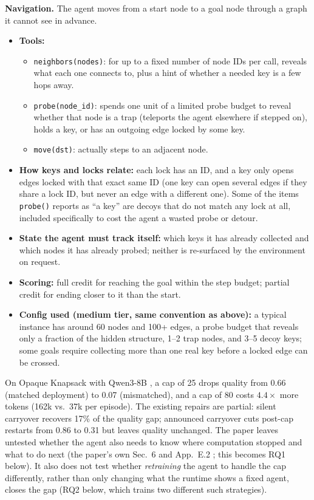 \documentclass[11pt,a4paper]{article}
\begin{document}
\textbf{Navigation.} The agent moves from a start node to a goal node through a graph it cannot
see in advance.
\begin{itemize}
\item \textbf{Tools:}
  \begin{itemize}
  \item \texttt{neighbors(nodes)}: for up to a fixed number of node IDs per call, reveals what
    each one connects to, plus a hint of whether a needed key is a few hops away.
  \item \texttt{probe(node\_id)}: spends one unit of a limited probe budget to reveal whether
    that node is a trap (teleports the agent elsewhere if stepped on), holds a key, or has an
    outgoing edge locked by some key.
  \item \texttt{move(dst)}: actually steps to an adjacent node.
  \end{itemize}
\item \textbf{How keys and locks relate:} each lock has an ID, and a key only opens edges locked
  with that exact same ID (one key can open several edges if they share a lock ID, but never an
  edge with a different one). Some of the items \texttt{probe()} reports as ``a key'' are decoys
  that do not match any lock at all, included specifically to cost the agent a wasted probe or
  detour.
\item \textbf{State the agent must track itself:} which keys it has already collected and which
  nodes it has already probed; neither is re-surfaced by the environment on request.
\item \textbf{Scoring:} full credit for reaching the goal within the step budget; partial credit
  for ending closer to it than the start.
\item \textbf{Config used (medium tier, same convention as above):} a typical instance has
  around 60 nodes and 100+ edges, a probe budget that reveals only a fraction of the hidden
  structure, 1--2 trap nodes, and 3--5 decoy keys; some goals require collecting more than one
  real key before a locked edge can be crossed.
\end{itemize}

On Opaque Knapsack with Qwen3-8B \cite{paper}, a cap of 25 drops quality from 0.66 (matched
deployment) to 0.07 (mismatched), and a cap of 80 costs $4.4\times$ more tokens (162k vs.\ 37k
per episode). The existing repairs are partial: silent carryover recovers 17\% of the quality
gap; announced carryover cuts post-cap restarts from 0.86 to 0.31 but leaves quality unchanged.
The paper leaves untested whether the agent also needs to know where computation stopped and
what to do next (the paper's own Sec.~6 and App.~E.2 \cite{paper}; this becomes RQ1 below). It
also does not test whether \emph{retraining} the agent to handle the cap differently, rather
than only changing what the runtime shows a fixed agent, closes the gap (RQ2 below, which trains
two different such strategies).
\end{document}
